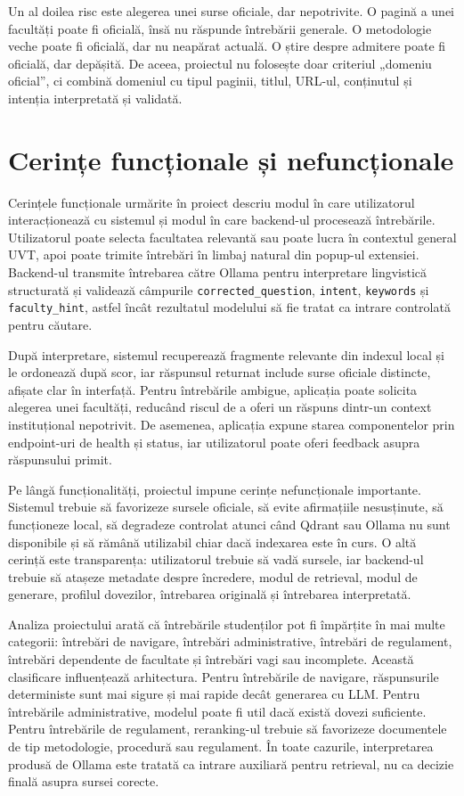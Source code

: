 \documentclass[12pt,a4paper]{report}
\theoremstyle{definition}
\theoremstyle{remark}
\begin{document}
Un al doilea risc este alegerea unei surse oficiale, dar nepotrivite. O pagină a unei facultăți poate fi oficială, însă nu răspunde întrebării generale. O metodologie veche poate fi oficială, dar nu neapărat actuală. O știre despre admitere poate fi oficială, dar depășită. De aceea, proiectul nu folosește doar criteriul „domeniu oficial”, ci combină domeniul cu tipul paginii, titlul, URL-ul, conținutul și intenția interpretată și validată.

\section{Cerințe funcționale și nefuncționale}
Cerințele funcționale urmărite în proiect descriu modul în care utilizatorul interacționează cu sistemul și modul în care backend-ul procesează întrebările. Utilizatorul poate selecta facultatea relevantă sau poate lucra în contextul general UVT, apoi poate trimite întrebări în limbaj natural din popup-ul extensiei. Backend-ul transmite întrebarea către Ollama pentru interpretare lingvistică structurată și validează câmpurile \texttt{corrected\_question}, \texttt{intent}, \texttt{keywords} și \texttt{faculty\_hint}, astfel încât rezultatul modelului să fie tratat ca intrare controlată pentru căutare.

După interpretare, sistemul recuperează fragmente relevante din indexul local și le ordonează după scor, iar răspunsul returnat include surse oficiale distincte, afișate clar în interfață. Pentru întrebările ambigue, aplicația poate solicita alegerea unei facultăți, reducând riscul de a oferi un răspuns dintr-un context instituțional nepotrivit. De asemenea, aplicația expune starea componentelor prin endpoint-uri de health și status, iar utilizatorul poate oferi feedback asupra răspunsului primit.

Pe lângă funcționalități, proiectul impune cerințe nefuncționale importante. Sistemul trebuie să favorizeze sursele oficiale, să evite afirmațiile nesusținute, să funcționeze local, să degradeze controlat atunci când Qdrant sau Ollama nu sunt disponibile și să rămână utilizabil chiar dacă indexarea este în curs. O altă cerință este transparența: utilizatorul trebuie să vadă sursele, iar backend-ul trebuie să atașeze metadate despre încredere, modul de retrieval, modul de generare, profilul dovezilor, întrebarea originală și întrebarea interpretată.

Analiza proiectului arată că întrebările studenților pot fi împărțite în mai multe categorii: întrebări de navigare, întrebări administrative, întrebări de regulament, întrebări dependente de facultate și întrebări vagi sau incomplete. Această clasificare influențează arhitectura. Pentru întrebările de navigare, răspunsurile deterministe sunt mai sigure și mai rapide decât generarea cu LLM. Pentru întrebările administrative, modelul poate fi util dacă există dovezi suficiente. Pentru întrebările de regulament, reranking-ul trebuie să favorizeze documentele de tip metodologie, procedură sau regulament. În toate cazurile, interpretarea produsă de Ollama este tratată ca intrare auxiliară pentru retrieval, nu ca decizie finală asupra sursei corecte.
\end{document}

